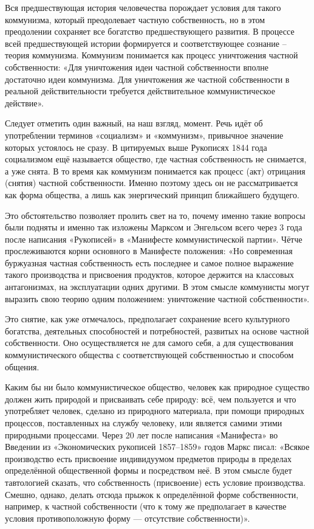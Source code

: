 \documentclass[12pt,a4paper,openany]{book}
\begin{document}
Вся предшествующая история человечества порождает условия для такого коммунизма, который преодолевает частную собственность, но в этом преодолении сохраняет все богатство предшествующего развития. В процессе всей предшествующей истории формируется и соответствующее сознание – теория коммунизма. Коммунизм понимается как процесс уничтожения частной собственности: «Для уничтожения идеи частной собственности вполне достаточно идеи коммунизма. Для уничтожения же частной собственности в реальной действительности требуется действительное коммунистическое действие».

Следует отметить один важный, на наш взгляд, момент. Речь идёт об употреблении терминов «социализм» и «коммунизм», привычное значение которых устоялось не сразу. В цитируемых выше Рукописях 1844 года социализмом ещё называется общество, где частная собственность не снимается, а уже снята. В то время как коммунизм понимается как процесс (акт) отрицания (снятия) частной собственности. Именно поэтому здесь он не рассматривается как форма общества, а лишь как энергический принцип ближайшего будущего.

Это обстоятельство позволяет пролить свет на то, почему именно такие вопросы были подняты и именно так изложены Марксом и Энгельсом всего через 3 года после написания «Рукописей» в «Манифесте коммунистической партии». Чётче прослеживаются корни основного в Манифесте положения: «Но современная буржуазная частная собственность есть последнее и самое полное выражение такого производства и присвоения продуктов, которое держится на классовых антагонизмах, на эксплуатации одних другими. В этом смысле коммунисты могут выразить свою теорию одним положением: уничтожение частной собственности».

Это снятие, как уже отмечалось, предполагает сохранение всего культурного богатства, деятельных способностей и потребностей, развитых на основе частной собственности. Оно осуществляется не для самого себя, а для существования коммунистического общества с соответствующей собственностью и способом общения.

Каким бы ни было коммунистическое общество, человек как природное существо должен жить природой и присваивать себе природу: всё, чем пользуется и что употребляет человек, сделано из природного материала, при помощи природных процессов, поставленных на службу человеку, или является самими этими природными процессами. Через 20 лет после написания «Манифеста» во Введении из «Экономических рукописей 1857–1859» годов Маркс писал: «Всякое производство есть присвоение индивидуумом предметов природы в пределах определённой общественной формы и посредством неё. В этом смысле будет тавтологией сказать, что собственность (присвоение) есть условие производства. Смешно, однако, делать отсюда прыжок к определённой форме собственности, например, к частной собственности (что к тому же предполагает в качестве условия противоположную форму — отсутствие собственности)».
\end{document}

